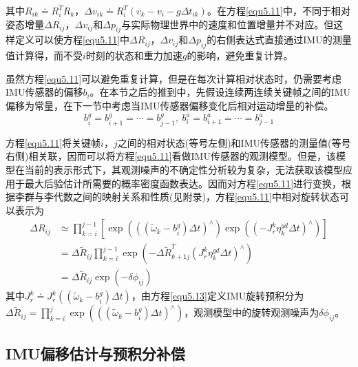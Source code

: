 其中$R_{ik} \doteq R_i^T R_k$，$\Delta v_{ik} \doteq R_i^T \left( v_k -v_i-g\Delta t_{ik} \right)$。在方程\ref{equ5.11}中，不同于相对姿态增量$\Delta R_{ij}$，$\Delta v_{ij}$和$\Delta p_{ij}$与实际物理世界中的速度和位置增量并不对应。但这样定义可以使方程\ref{equ5.11}中$\Delta R_{ij}$，$\Delta v_{ij}$和$\Delta p_{ij}$的右侧表达式直接通过IMU的测量值计算得，而不受$i$时刻的状态和重力加速$g$的影响，避免重复计算。

虽然方程\ref{equ5.11}可以避免重复计算，但是在每次计算相对状态时，仍需要考虑IMU传感器的偏移$b_i$。在本节之后的推到中，先假设连续两连续关键帧之间的IMU偏移为常量，在下一节中考虑当IMU传感器偏移变化后相对运动增量的补偿。
\begin{equation}
\label{equ5.12}
b_i^g = b_{i+1}^g = \cdots = b_{j-1}^g, \  b_i^a = b_{i+1}^a = \cdots = b_{j-1}^a
\end{equation}

方程\ref{equ5.11}将关键帧$i$，$j$之间的相对状态(等号左侧)和IMU传感器的测量值(等号右侧)相关联，因而可以将方程\ref{equ5.11}看做IMU传感器的观测模型。但是，该模型在当前的表示形式下，其观测噪声的不确定性分析较为复杂，无法获取该模型应用于最大后验估计所需要的概率密度函数表达。因而对方程\ref{equ5.11}进行变换，根据李群与李代数之间的映射关系和性质(见附录)，方程\ref{equ5.11}中相对旋转状态可以表示为
\begin{equation}
\label{equ5.13}
\begin{aligned}
\Delta R_{ij} & \simeq \prod\limits_{k=i}^{j-1} \left[ \exp \left( \left( \left( \widetilde{\omega}_k - b_i^g \right) \Delta t \right)^{\wedge}  \right)  
\exp \left( \left( -J_r^k \eta_k^{gd} \Delta t \right)^{\wedge} \right)\right] \\
&= \Delta \widetilde{R}_{ij} \prod\limits_{k=i}^{j-1}\exp \left( -\Delta \widetilde{R}_{k+1j}^T \left( J_r^k \eta_k^{gd} \Delta t \right)^{\wedge}  \right) \\ 
&= \Delta \widetilde{R}_{ij} \exp \left( -\delta \phi_{ij} \right)
\end{aligned}
\end{equation}
其中$J_r^k \doteq J_r^k( \left( \widetilde{\omega}_k - b_i^g \right) \Delta t)$，由方程\ref{equ5.13}定义IMU旋转预积分为$\Delta \widetilde{R}_{ij} = \prod_{k=i}^j\exp \left( \left( \left( \widetilde{\omega}_k - b_i^g \right) \Delta t \right)^{\wedge}  \right)$，观测模型中的旋转观测噪声为$\delta \phi_{ij}$。



\subsection{IMU偏移估计与预积分补偿}







